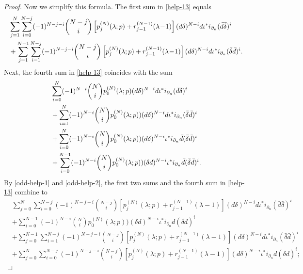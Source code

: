 \documentclass[a4paper,12pt,reqno]{amsart}
\numberwithin{theorem}{subsection}
\numberwithin{equation}{section}
\begin{document}
\begin{proof}
Now we simplify this formula. The first sum in \eqref{help-13} equals
\begin{align}
   & \sum_{j=1}^N \sum_{i=0}^{N-j} (-1)^{N-j-i} \binom{N-j}{i}
   \left[p_j^{(N)}(\lambda;p)+r_{j-1}^{(N-1)}(\lambda\!-\!1)\right]
   ({d}\delta)^{N-i} {d} \iota^* i_{\partial_n} (\bar{d}\bar{\delta})^i \notag \\
   & + \sum_{j=1}^{N-1}\sum_{i=1}^{N-j}(-1)^{N-j-i} \binom{N-j}{i}
   \left[p_j^{(N)}(\lambda;p)+r_{j-1}^{(N-1)}(\lambda\!-\!1)\right]
   ({d}\delta)^{N-i} {d} \iota^* i_{\partial_n} (\bar{\delta}\bar{d})^i. \label{odd-help-1}
\end{align}
Next, the fourth sum in \eqref{help-13} coincides with the sum
\begin{align}
    & \sum_{i=0}^{N} (-1)^{N-i} \binom{N}{i} p_0^{(N)}(\lambda;p)({d}\delta)^{N-i}{d}\iota^* i_{\partial_n}
    (\bar{d}\bar{\delta})^i \notag \\
    & + \sum_{i=1}^{N}(-1)^{N-i} \binom{N}{i} p_0^{(N)}(\lambda;p))({d}\delta)^{N-i}{d}\iota^* i_{\partial_n}
    (\bar{\delta}\bar{d})^i \notag \\
    & + \sum_{i=0}^{N}(-1)^{N-i} \binom{N}{i} p_0^{(N)}(\lambda;p))({d}\delta)^{N-i}\iota^* i_{\partial_n}
    \bar{d} (\bar{\delta}\bar{d})^i \notag \\
    & +\sum_{i=0}^{N-1}(-1)^{N-i} \binom{N}{i} p_0^{(N)}(\lambda;p))(\delta{d})^{N-i}\iota^* i_{\partial_n}
    \bar{d} (\bar{\delta}\bar{d})^i. \label{odd-help-2}
\end{align}
By \eqref{odd-help-1} and \eqref{odd-help-2}, the first two sums and the fourth
sum in \eqref{help-13} combine to
\begin{align*}
   & \sum_{j=0}^N \sum_{i=0}^{N-j}(-1)^{N-j-i} \binom{N-j}{i}
   \left[p_j^{(N)}(\lambda;p) + r_{j-1}^{(N-1)}(\lambda\!-\!1)\right]
   ({d}\delta)^{N-i} {d} \iota^* i_{\partial_n} (\bar{d}\bar{\delta})^i \\
   & + \sum_{i=0}^{N-1}(-1)^{N-i} \binom{N}{i} p_0^{(N)}(\lambda;p))(\delta{d})^{N-i}\iota^* i_{\partial_n}
   \bar{d}(\bar{\delta}\bar{d})^i \\
   & + \sum_{j=0}^{N-1}\sum_{i=1}^{N-j} (-1)^{N-j-i} \binom{N-j}{i}
   \left[p_j^{(N)}(\lambda;p) + r_{j-1}^{(N-1)}(\lambda\!-\!1)\right]
   ({d}\delta)^{N-i} {d} \iota^* i_{\partial_n} (\bar{\delta}\bar{d})^i\\
   & + \sum_{j=0}^N\sum_{i=0}^{N-j}(-1)^{N-j-i} \binom{N-j}{i}
   \left[p_j^{(N)}(\lambda;p) + r_{j-1}^{(N-1)}(\lambda\!-\!1)\right]
   ({d}\delta)^{N-i} \iota^* i_{\partial_n} \bar{d} (\bar{\delta}\bar{d})^i;

\end{align*}
\end{proof}
\end{document}
